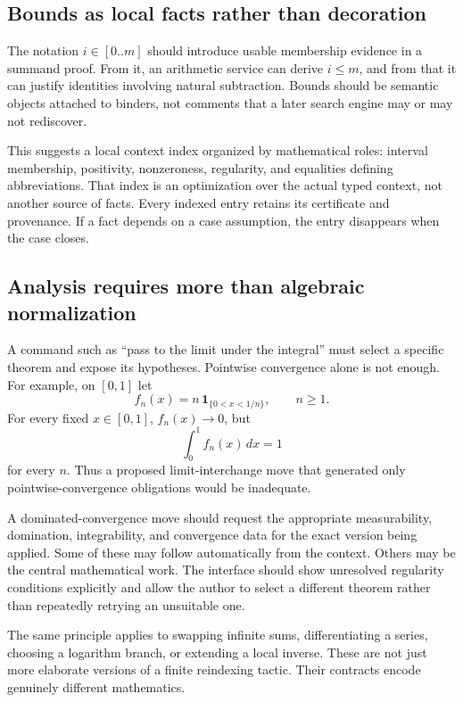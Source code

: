 \documentclass[11pt,a4paper]{article}
\newcommand{\ind}[1]{\mathbf 1_{\{#1\}}}
\theoremstyle{remark}
\begin{document}
\subsection{Bounds as local facts rather than decoration}
The notation $i\in[0..m]$ should introduce usable membership evidence in a summand proof. From it, an arithmetic service can derive $i\leq m$, and from that it can justify identities involving natural subtraction. Bounds should be semantic objects attached to binders, not comments that a later search engine may or may not rediscover.

This suggests a local context index organized by mathematical roles: interval membership, positivity, nonzeroness, regularity, and equalities defining abbreviations. That index is an optimization over the actual typed context, not another source of facts. Every indexed entry retains its certificate and provenance. If a fact depends on a case assumption, the entry disappears when the case closes.

\subsection{Analysis requires more than algebraic normalization}
A command such as ``pass to the limit under the integral'' must select a specific theorem and expose its hypotheses. Pointwise convergence alone is not enough. For example, on $[0,1]$ let
\[
f_n(x)=n\,\ind{0<x<1/n},\qquad n\geq1.
\]
For every fixed $x\in[0,1]$, $f_n(x)\to0$, but
\[
\int_0^1 f_n(x)\,dx=1
\]
for every $n$. Thus a proposed limit-interchange move that generated only pointwise-convergence obligations would be inadequate.

A dominated-convergence move should request the appropriate measurability, domination, integrability, and convergence data for the exact version being applied. Some of these may follow automatically from the context. Others may be the central mathematical work. The interface should show unresolved regularity conditions explicitly and allow the author to select a different theorem rather than repeatedly retrying an unsuitable one.

The same principle applies to swapping infinite sums, differentiating a series, choosing a logarithm branch, or extending a local inverse. These are not just more elaborate versions of a finite reindexing tactic. Their contracts encode genuinely different mathematics.
\end{document}
